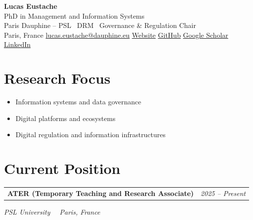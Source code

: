 \documentclass[11pt,a4paper]{article}
\makeatletter
\newlength{\cvindent}
\let\cvoldsection\section
\renewcommand{\section}[1]{\Needspace{5\baselineskip}\cvoldsection{#1}}
\newenvironment{cvblock}[1][1]{%
  \par\noindent\hspace*{#1\cvindent}%
  \begin{minipage}{\dimexpr\linewidth-#1\cvindent\relax}%
}{%
  \end{minipage}\par
}
\newenvironment{cvdetails}{%
  \begin{list}{}{%
    \setlength{\leftmargin}{\cvindent}%
    \setlength{\rightmargin}{0pt}%
    \setlength{\topsep}{0.1em}%
    \setlength{\partopsep}{0pt}%
    \setlength{\parsep}{0.05em}%
    \setlength{\itemsep}{0pt}%
  }\item[]\small\ignorespaces
}{%
  \end{list}
}
\newcommand{\cvcontactsep}{\hspace{0.55em}{\color{rulecolor}\textbar}\hspace{0.55em}}
\newcommand{\cventry}[4]{%
  \begin{cvblock}
    \begin{tabularx}{\linewidth}{@{}X r@{}}%
      \textbf{#1} & \textit{#4} \\
    \end{tabularx}\par
    \begin{cvdetails}
      {\small\itshape #2%
        \if\relax\detokenize{#3}\relax
        \else\ \textbullet\ #3
        \fi}\par
    \end{cvdetails}
  \end{cvblock}\vspace{0.35em}%
}
\makeatother
\begin{document}
\pagestyle{plain}

\begin{center}
  {\fontsize{27}{31}\selectfont\bfseries\color{accent}Lucas Eustache}\\[0.15em]
  {\normalsize\color{muted}PhD in Management and Information Systems}\\[0.1em]
  {\small Paris Dauphine -- PSL \textbullet\ DRM \textbullet\ Governance \& Regulation Chair}\\[0.35em]
  {\footnotesize
    Paris, France
    \cvcontactsep
    \href{mailto:lucas.eustache@dauphine.eu}{lucas.eustache@dauphine.eu}
    \cvcontactsep
    \href{https://lucaseust.github.io}{Website}
    \cvcontactsep
    \href{https://github.com/Lucaseust}{GitHub}
    \cvcontactsep
    \href{https://scholar.google.com/citations?hl=fr&user=dGImyt0AAAAJ}{Google Scholar}
    \cvcontactsep
    \href{https://www.linkedin.com/in/lucas-eustache-611a9a223}{LinkedIn}
  }
\end{center}


\section{Research Focus}
\begin{itemize}
  \item Information systems and data governance
  \item Digital platforms and ecosystems
  \item Digital regulation and information infrastructures
\end{itemize}

\section{Current Position}
\cventry
  {ATER (Temporary Teaching and Research Associate)}
  {PSL University}
  {Paris, France}
  {2025 -- Present}


\end{document}
